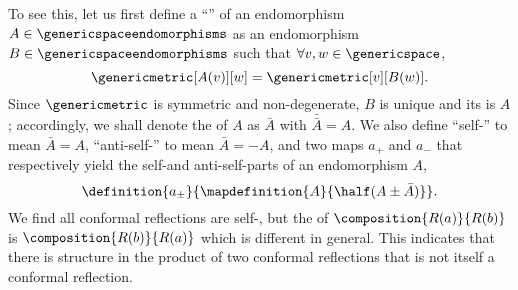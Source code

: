 \documentclass{article}
\begin{document}
To see this, let us first define a \enquote{\gadjoint} of an endomorphism $A\in\genericspaceendomorphisms$ as an endomorphism $B\in\genericspaceendomorphisms$ such that $\forall v,w\in\genericspace$, 
\begin{equation}
    \genericmetric[A(v)][w]=\genericmetric[v][B(w)].
\end{equation}
\noindent Since $\genericmetric$ is symmetric and non-degenerate, $B$ is unique and its \gadjoint\space is $A$; accordingly, we shall denote the \gadjoint\space of $A$ as $\bar{A}$ with $\bar{\bar{A}}=A$. We also define \enquote{self-\gadjoint} to mean $\bar{A}=A$, \enquote{anti-self-\gadjoint} to mean $\bar{A}=-A$, and two maps $a_{+}$ and $a_{-}$ that respectively yield the self-\gadjoint\space and anti-self-\gadjoint\space parts of an endomorphism $A$,
\begin{equation}
    \definition{a_{\pm}}{\mapdefinition{A}{\half(A\pm\bar{A})}}.
\end{equation}
\noindent
We find all conformal reflections are self-\gadjoint, but the \gadjoint\space of $\composition{R(a)}{R(b)}$ is $\composition{R(b)}{R(a)}$ which is different in general. This indicates that there is structure in the product of two conformal reflections that is not itself a conformal reflection.
\end{document}
